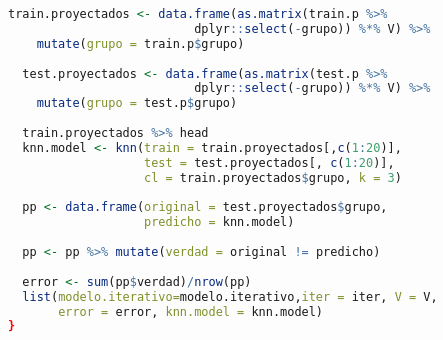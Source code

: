 \begin{lstlisting}[language=R, basicstyle=\small]
  train.proyectados <- data.frame(as.matrix(train.p %>% 
                          dplyr::select(-grupo)) %*% V) %>%
    mutate(grupo = train.p$grupo)
  
  test.proyectados <- data.frame(as.matrix(test.p %>% 
                          dplyr::select(-grupo)) %*% V) %>%
    mutate(grupo = test.p$grupo)
  
  train.proyectados %>% head
  knn.model <- knn(train = train.proyectados[,c(1:20)], 
                   test = test.proyectados[, c(1:20)], 
                   cl = train.proyectados$grupo, k = 3)
  
  pp <- data.frame(original = test.proyectados$grupo, 
                   predicho = knn.model)
  
  pp <- pp %>% mutate(verdad = original != predicho)
  
  error <- sum(pp$verdad)/nrow(pp)
  list(modelo.iterativo=modelo.iterativo,iter = iter, V = V, 
       error = error, knn.model = knn.model)
}
\end{lstlisting}

